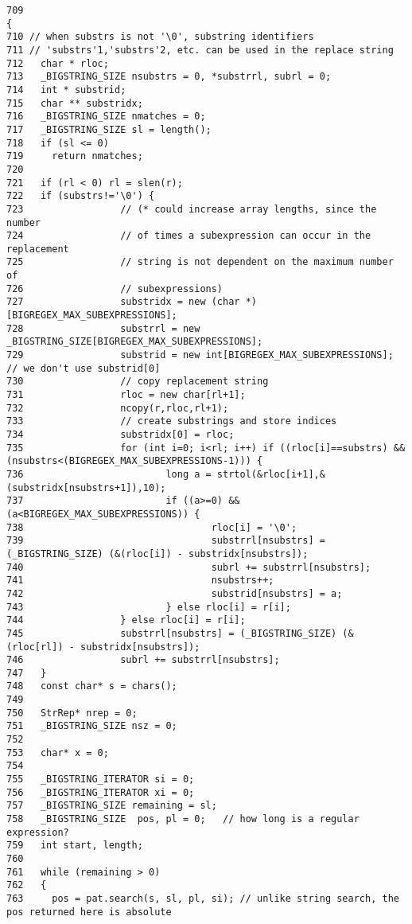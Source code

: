 \footnotesize\begin{verbatim}709                                                                                                          { 
710 // when substrs is not '\0', substring identifiers
711 // 'substrs'1,'substrs'2, etc. can be used in the replace string
712   char * rloc;
713   _BIGSTRING_SIZE nsubstrs = 0, *substrrl, subrl = 0;
714   int * substrid;
715   char ** substridx;
716   _BIGSTRING_SIZE nmatches = 0;
717   _BIGSTRING_SIZE sl = length();
718   if (sl <= 0)
719     return nmatches;
720 
721   if (rl < 0) rl = slen(r);
722   if (substrs!='\0') {
723                 // (* could increase array lengths, since the number
724                 // of times a subexpression can occur in the replacement
725                 // string is not dependent on the maximum number of
726                 // subexpressions)
727                 substridx = new (char *)[BIGREGEX_MAX_SUBEXPRESSIONS];
728                 substrrl = new _BIGSTRING_SIZE[BIGREGEX_MAX_SUBEXPRESSIONS];
729                 substrid = new int[BIGREGEX_MAX_SUBEXPRESSIONS]; // we don't use substrid[0]
730                 // copy replacement string
731                 rloc = new char[rl+1];
732                 ncopy(r,rloc,rl+1);
733                 // create substrings and store indices
734                 substridx[0] = rloc;
735                 for (int i=0; i<rl; i++) if ((rloc[i]==substrs) && (nsubstrs<(BIGREGEX_MAX_SUBEXPRESSIONS-1))) {
736                         long a = strtol(&rloc[i+1],&(substridx[nsubstrs+1]),10);
737                         if ((a>=0) && (a<BIGREGEX_MAX_SUBEXPRESSIONS)) {
738                                 rloc[i] = '\0';
739                                 substrrl[nsubstrs] = (_BIGSTRING_SIZE) (&(rloc[i]) - substridx[nsubstrs]);
740                                 subrl += substrrl[nsubstrs];
741                                 nsubstrs++;
742                                 substrid[nsubstrs] = a;
743                         } else rloc[i] = r[i];
744                 } else rloc[i] = r[i];
745                 substrrl[nsubstrs] = (_BIGSTRING_SIZE) (&(rloc[rl]) - substridx[nsubstrs]);
746                 subrl += substrrl[nsubstrs];
747   }
748   const char* s = chars();
749 
750   StrRep* nrep = 0;
751   _BIGSTRING_SIZE nsz = 0;
752 
753   char* x = 0;
754 
755   _BIGSTRING_ITERATOR si = 0;
756   _BIGSTRING_ITERATOR xi = 0;
757   _BIGSTRING_SIZE remaining = sl;
758   _BIGSTRING_SIZE  pos, pl = 0;   // how long is a regular expression?
759   int start, length;
760 
761   while (remaining > 0)
762   {
763     pos = pat.search(s, sl, pl, si); // unlike string search, the pos returned here is absolute

\end{verbatim}

